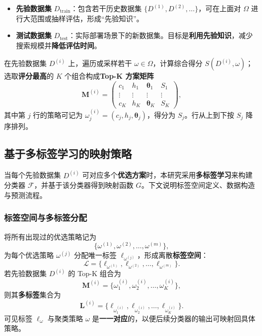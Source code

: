 \documentclass[8pt,twocolumn]{article} %
\numberwithin{equation}{section}
\begin{document}
\begin{itemize}
    \item \textbf{先验数据集} \(D_{\text{train}}\)：包含若干历史数据集 \(\{D^{(1)}, D^{(2)}, \dots\}\)，可在上面对 \(\Omega\) 进行大范围或抽样评估，形成“先验知识”。
    \item \textbf{测试数据集} \(D_{\text{test}}\)：实际部署场景下的新数据集。目标是\textbf{利用先验知识}，减少搜索规模并\textbf{降低评估时间}。
\end{itemize}

\label{subsec:topK-matrix}

在先验数据集 \(D^{(i)}\) 上，遍历或采样若干 \(\omega \in \Omega\)，计算综合得分 \(S(D^{(i)}, \omega)\)；选取\textbf{评分最高}的 \(K\) 个组合构成\textbf{Top-K 方案矩阵}
\begin{equation}\label{eq:topK-matrix}
\mathbf{M}^{(i)} = 
\begin{pmatrix}
c_1 & h_1 & \boldsymbol{\theta}_1 & S_1 \\
\vdots & \vdots & \vdots & \vdots \\
c_K & h_K & \boldsymbol{\theta}_K & S_K
\end{pmatrix},
\end{equation}
其中第 \(j\) 行的策略可记为 \(\omega_j^{(i)} = (c_j, h_j, \boldsymbol{\theta}_j)\)，得分为 \(S_j\)。行从上到下按 \(S_j\) 降序排列。

\subsection{基于多标签学习的映射策略}
\label{subsec:mapping-classification}

当每个先验数据集 \(D^{(i)}\) 可对应多个\textbf{优选方案}时，本研究采用\textbf{多标签学习}来构建分类器 \(\mathcal{F}\)，并基于该分类器得到映射函数 \(G\)。下文说明标签空间定义、数据构造与预测流程。

\subsubsection{标签空间与多标签分配}

将所有出现过的优选策略记为
\[
\{\omega^{(1)}, \omega^{(2)}, \ldots, \omega^{(m)}\},
\]
为每个优选策略 \(\omega^{(j)}\) 分配唯一标签 \(\ell_{\omega^{(j)}}\)，形成离散\textbf{标签空间}：
\begin{equation}\label{eq:label-space}
\mathcal{L}
= \{\ell_{\omega^{(1)}},\ell_{\omega^{(2)}},\ldots,\ell_{\omega^{(m)}}\}.
\end{equation}
若先验数据集 \(D^{(i)}\) 的 Top-K 组合为
\[
\mathbf{M}^{(i)} 
= \{\omega_1^{(i)},\omega_2^{(i)},\dots,\omega_K^{(i)}\},
\]
则其\textbf{多标签}集合为
\begin{equation}\label{eq:label-space for D}
\mathbf{L}^{(i)} 
= \{\ell_{\omega_1^{(i)}}, \ell_{\omega_2^{(i)}}, \dots, \ell_{\omega_K^{(i)}}\}.
\end{equation}
可见标签 \(\ell_{\omega}\) 与聚类策略 \(\omega\) 是\textbf{一一对应}的，以便后续分类器的输出可映射回具体策略。
\end{document}
